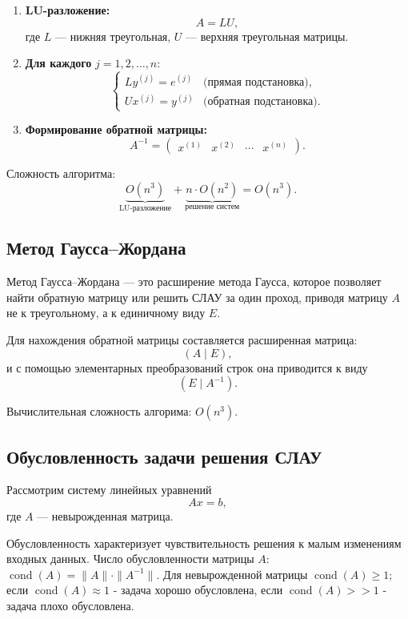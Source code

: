 \begin{enumerate}
	\item \textbf{LU-разложение:}
	\[
	A = LU,
	\]
	где $L$ — нижняя треугольная, $U$ — верхняя треугольная матрицы.
	
	\item \textbf{Для каждого} $j = 1, 2, \dots, n$:
	\[
	\begin{cases}
		L y^{(j)} = e^{(j)} & \text{(прямая подстановка)}, \\
		U x^{(j)} = y^{(j)} & \text{(обратная подстановка)}.
	\end{cases}
	\]
	
	\item \textbf{Формирование обратной матрицы:}
	\[
	A^{-1} = \begin{pmatrix}
		x^{(1)} & x^{(2)} & \cdots & x^{(n)}
	\end{pmatrix}.
	\]
\end{enumerate}


Сложность алгоритма:
\[
\underbrace{O(n^3)}_{\text{LU-разложение}} + \underbrace{n \cdot O(n^2)}_{\text{решение систем}} = O(n^3).
\]

\subsection{Метод Гаусса--Жордана}

Метод Гаусса--Жордана — это расширение метода Гаусса, которое позволяет найти обратную матрицу или решить СЛАУ за один проход, приводя матрицу $A$ не к треугольному, а к единичному виду $E$.

Для нахождения обратной матрицы составляется расширенная матрица:
\[
(A \mid E),
\]
и с помощью элементарных преобразований строк она приводится к виду
\[
(E \mid A^{-1}).
\]

Вычислительная сложность алгорима: $O(n^3)$.

\subsection{Обусловленность задачи решения СЛАУ}

Рассмотрим систему линейных уравнений
\[
Ax = b,
\]
где $A$ — невырожденная матрица.

Обусловленность характеризует чувствительность решения к малым изменениям входных данных. Число обусловленности матрицы $A$: $\operatorname{cond}(A) = \|A\| \cdot \|A^{-1}\|$. Для невырожденной матрицы $\operatorname{cond}(A) \geq 1$; если $\operatorname{cond}(A) \approx 1$ - задача хорошо обусловлена, если $\operatorname{cond}(A) >> 1$ - задача плохо обусловлена.\\

